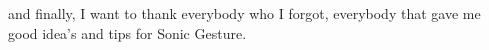 \documentclass[a4paper, 11pt]{book}
\begin{document}
and finally, I want to thank everybody who I forgot, everybody that gave me good idea's and tips for Sonic Gesture. 


\cleardoublepage
{}
\setcounter{page}{1}














\cleardoublepage
{}
{}





\end{document}

